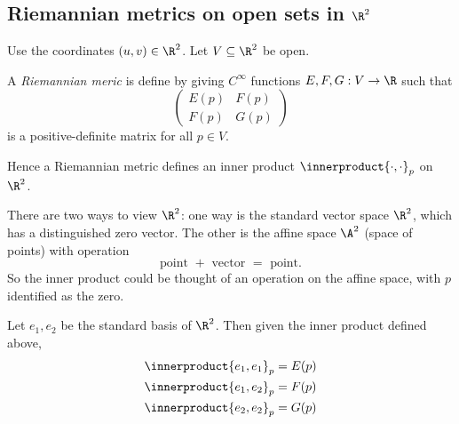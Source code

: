\documentclass[a4paper]{article}
\theoremstyle{definition}
\newcommand*{\inner}{\innerproduct}
\begin{document}
\subsection{Riemannian metrics on open sets in \texorpdfstring{\(\R^2\)}{ℝ\^{}2}}

Use the coordinates \((u, v) \in \R^2\). Let \(V \subseteq \R^2\) be open.

\begin{definition}
  A \emph{Riemannian meric} is define by giving \(C^\infty\) functions \(E, F, G: V \to \R\) such that
  \[
    \begin{pmatrix}
      E(p) & F(p) \\
      F(p) & G(p)
    \end{pmatrix}
  \]
  is a positive-definite matrix for all \(p \in V\).
\end{definition}

Hence a Riemannian metric defines an inner product \(\inner{\cdot, \cdot}_p\) on \(\R^2\).

\begin{remark}
  There are two ways to view \(\R^2\): one way is the standard vector space \(\R^2\), which has a distinguished zero vector. The other is the affine space \(\A^2\) (space of points) with operation
  \[
    \text{point } + \text{ vector } = \text{ point}.
  \]
  So the inner product could be thought of an operation on the affine space, with \(p\) identified as the zero.
\end{remark}

Let \(e_1, e_2\) be the standard basis of \(\R^2\). Then given the inner product defined above,
\begin{align*}
  \inner{e_1, e_1}_p &= E(p) \\
  \inner{e_1, e_2}_p &= F(p) \\
  \inner{e_2, e_2}_p &= G(p)
\end{align*}
\end{document}
